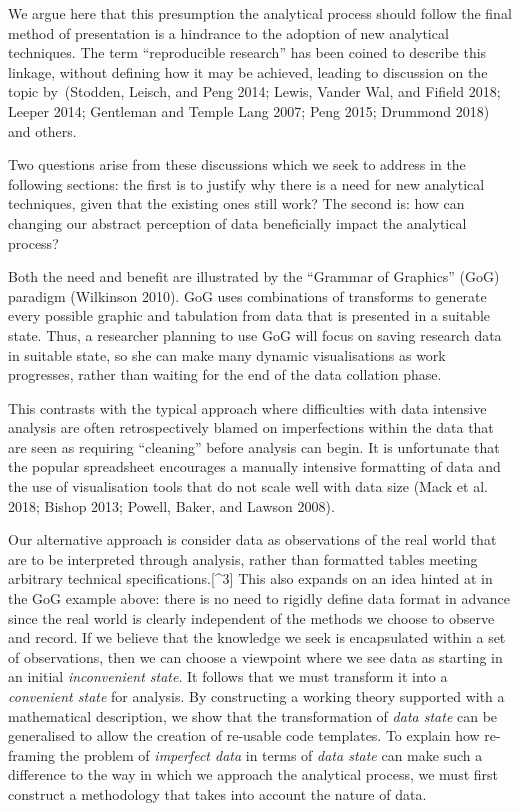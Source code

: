 \documentclass[smallextended]{svjour3}       %
\begin{document}
We argue here that this presumption the analytical process should follow the final method of presentation is a hindrance to the adoption of new analytical techniques. The term ``reproducible research'' has been coined to describe this linkage, without defining how it may be achieved, leading to discussion on the topic by~(Stodden, Leisch, and Peng 2014; Lewis, Vander Wal, and Fifield 2018; Leeper 2014; Gentleman and Temple Lang 2007; Peng 2015; Drummond 2018) and others.

Two questions arise from these discussions which we seek to address in the following sections: the first is to justify why there is a need for new analytical techniques, given that the existing ones still work? The second is: how can changing our abstract perception of data beneficially impact the analytical process?

Both the need and benefit are illustrated by the ``Grammar of Graphics'' (GoG) paradigm (Wilkinson 2010). GoG uses combinations of transforms to generate every possible graphic and tabulation from data that is presented in a suitable state. Thus, a researcher planning to use GoG will focus on saving research data in suitable state, so she can make many dynamic visualisations as work progresses, rather than waiting for the end of the data collation phase.

This contrasts with the typical approach where difficulties with data intensive analysis are often retrospectively blamed on imperfections within the data that are seen as requiring ``cleaning'' before analysis can begin. It is unfortunate that the popular spreadsheet encourages a manually intensive formatting of data and the use of visualisation tools that do not scale well with data size (Mack et al. 2018; Bishop 2013; Powell, Baker, and Lawson 2008).

Our alternative approach is consider data as observations of the real world that are to be interpreted through analysis, rather than formatted tables meeting arbitrary technical specifications.{[}\^{}3{]} This also expands on an idea hinted at in the GoG example above: there is no need to rigidly define data format in advance since the real world is clearly independent of the methods we choose to observe and record. If we believe that the knowledge we seek is encapsulated within a set of observations, then we can choose a viewpoint where we see data as starting in an initial \emph{inconvenient state}. It follows that we must transform it into a \emph{convenient state} for analysis. By constructing a working theory supported with a mathematical description, we show that the transformation of \emph{data state} can be generalised to allow the creation of re-usable code templates. To explain how re-framing the problem of \emph{imperfect data} in terms of \emph{data state} can make such a difference to the way in which we approach the analytical process, we must first construct a methodology that takes into account the nature of data.
\end{document}
